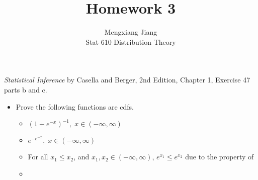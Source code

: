 \documentclass[12pt]{article}
\newenvironment{problem}[2][Problem]{\begin{trivlist}
\item[\hskip \labelsep {\bfseries #1}\hskip \labelsep {\bfseries #2.}]}
{\end{trivlist}}
\begin{document}
 
 
\title{Homework 3}%
\author{Mengxiang Jiang\\ %
Stat 610 Distribution Theory} %
 
\maketitle
 
\begin{problem}{1} %
  \textit{Statistical Inference} by Casella and Berger, 2nd Edition, Chapter 1, 
  Exercise 47 parts b and c.
  \begin{itemize}
    \item[47.] Prove the following functions are cdfs.
    \begin{itemize}
      \item [(b)] $\left(1 + e^{-x}\right)^{-1},\;x \in (-\infty, \infty)$
      \item [(c)] $e^{-e^{-x}},\; x \in (-\infty, \infty)$
    \end{itemize}
    \begin{itemize}
      \item [(b)] For all $x_1 \le x_2$, and $x_1, x_2 \in (-\infty, \infty)$,
      $e^{x_1} \le e^{x_2}$ due to the property of 
      \item 
    \end{itemize}
  \end{itemize}
\end{problem}

\end{document}
